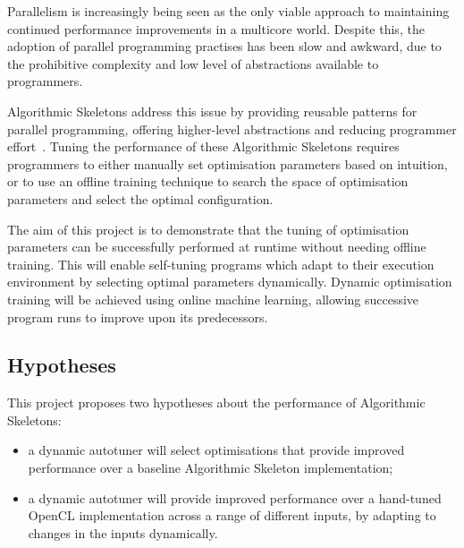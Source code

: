 Parallelism is increasingly being seen as the only viable approach to
maintaining continued performance improvements in a multicore
world. Despite this, the adoption of parallel programming practises
has been slow and awkward, due to the prohibitive complexity and low
level of abstractions available to programmers.

Algorithmic Skeletons address this issue by providing reusable
patterns for parallel programming, offering higher-level abstractions
and reducing programmer effort~\cite{Cole1989, Cole2004}. Tuning the
performance of these Algorithmic Skeletons requires programmers to
either manually set optimisation parameters based on intuition, or to
use an offline training technique to search the space of optimisation
parameters and select the optimal configuration.

The aim of this project is to demonstrate that the tuning of
optimisation parameters can be successfully performed at runtime
without needing offline training. This will enable self-tuning
programs which adapt to their execution environment by selecting
optimal parameters dynamically. Dynamic optimisation training will be
achieved using online machine learning, allowing successive program
runs to improve upon its predecessors.

%

\subsection{Hypotheses}
This project proposes two hypotheses about the performance of
Algorithmic Skeletons:
\begin{itemize}
\item a dynamic autotuner will select optimisations that provide
  improved performance over a baseline Algorithmic Skeleton
  implementation;
\item a dynamic autotuner will provide improved performance over a
  hand-tuned OpenCL implementation across a range of different inputs,
  by adapting to changes in the inputs dynamically.
\end{itemize}

